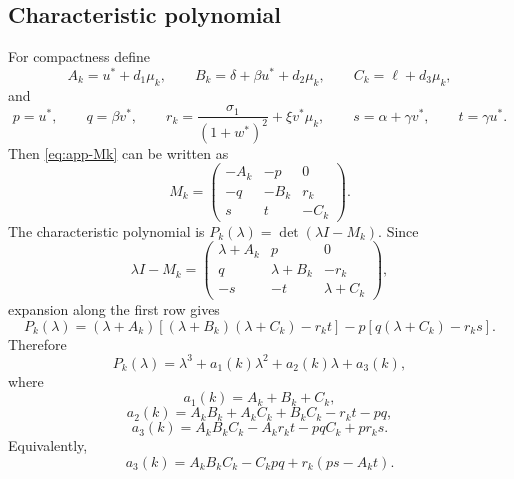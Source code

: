 \documentclass[a4paper,fleqn,longmktitle]{cas-sc}
\theoremstyle{plain}
\theoremstyle{definition}
\numberwithin{equation}{section}
\begin{document}
\subsection{Characteristic polynomial}
\label{app:rh-characteristic-polynomial}
For compactness define
\begin{equation}\label{eq:app-rh-notation}
A_k=u^*+d_1\mu_k,\qquad
B_k=\delta+\beta u^*+d_2\mu_k,\qquad
C_k=\ell+d_3\mu_k,
\end{equation}
and
\begin{equation}\label{eq:app-rh-notation-2}
p=u^*,\qquad
q=\beta v^*,\qquad
r_k=\frac{\sigma_1}{(1+w^*)^2}+\xi v^*\mu_k,\qquad
s=\alpha+\gamma v^*,\qquad
t=\gamma u^*.
\end{equation}
Then \eqref{eq:app-Mk} can be written as
\begin{equation}\label{eq:app-Mk-compact}
M_k=
\begin{pmatrix}
-A_k & -p & 0\\
-q & -B_k & r_k\\
s & t & -C_k
\end{pmatrix}.
\end{equation}
The characteristic polynomial is \(P_k(\lambda)=\det(\lambda I-M_k)\). Since
\[
\lambda I-M_k
=
\begin{pmatrix}
\lambda+A_k & p & 0\\
q & \lambda+B_k & -r_k\\
-s & -t & \lambda+C_k
\end{pmatrix},
\]
expansion along the first row gives
\[
P_k(\lambda)
=
(\lambda+A_k)
\left[
(\lambda+B_k)(\lambda+C_k)-r_k t
\right]
-
p\left[
q(\lambda+C_k)-r_k s
\right].
\]
Therefore
\[
P_k(\lambda)
=
\lambda^3+a_1(k)\lambda^2+a_2(k)\lambda+a_3(k),
\]
where
\begin{equation}\label{eq:app-a1}
a_1(k)=A_k+B_k+C_k,
\end{equation}
\begin{equation}\label{eq:app-a2}
a_2(k)=A_kB_k+A_kC_k+B_kC_k-r_k t-pq,
\end{equation}
\begin{equation}\label{eq:app-a3}
a_3(k)=A_kB_kC_k-A_k r_k t-pq C_k+p r_k s.
\end{equation}
Equivalently,
\begin{equation}\label{eq:app-a3-alternative}
a_3(k)
=
A_kB_kC_k-C_kpq+r_k(ps-A_kt).
\end{equation}
\end{document}
